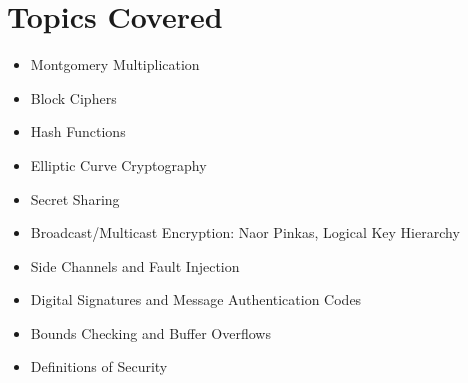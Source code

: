 \section{Topics Covered}
\begin{itemize}
\item Montgomery Multiplication
\item Block Ciphers
\item Hash Functions
\item Elliptic Curve Cryptography
\item Secret Sharing
\item Broadcast/Multicast Encryption: Naor Pinkas, Logical Key Hierarchy
\item Side Channels and Fault Injection
\item Digital Signatures and Message Authentication Codes
\item Bounds Checking and Buffer Overflows
\item Definitions of Security
\end{itemize}